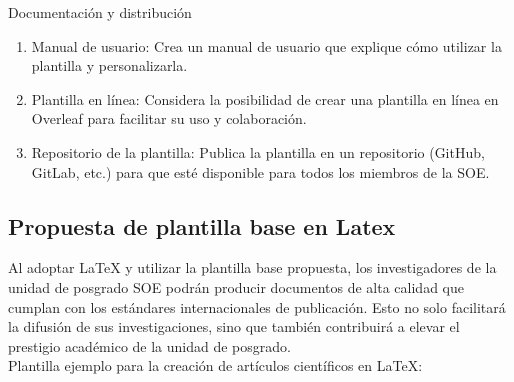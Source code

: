 \documentclass[10pt]{article}
\begin{document}
    Documentación y distribución
    \begin{enumerate}
        \item Manual de usuario: Crea un manual de usuario que explique cómo utilizar la plantilla y personalizarla.
        \item Plantilla en línea: Considera la posibilidad de crear una plantilla en línea en Overleaf para facilitar su uso y colaboración.
        \item Repositorio de la plantilla: Publica la plantilla en un repositorio (GitHub, GitLab, etc.) para que esté disponible para todos los miembros de la SOE.
    \end{enumerate}
    
    
    \subsection{Propuesta de plantilla base en Latex}
    Al adoptar LaTeX y utilizar la plantilla base propuesta, los investigadores de la unidad de posgrado SOE podrán producir documentos de alta calidad que cumplan con los estándares internacionales de publicación. 
    Esto no solo facilitará la difusión de sus investigaciones, sino que también contribuirá a elevar el prestigio académico de la unidad de posgrado.\\
    Plantilla ejemplo para la creación de artículos científicos en LaTeX:
\end{document}
